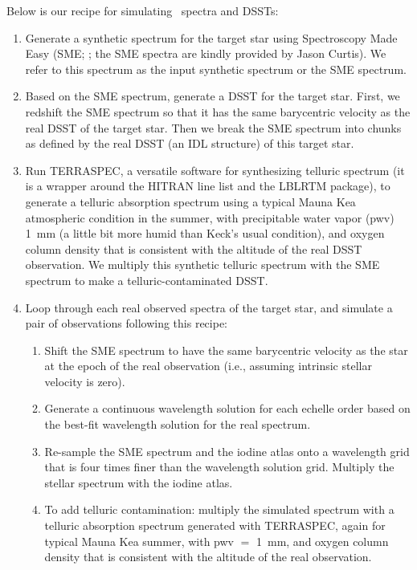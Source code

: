 Below is our recipe for simulating \keck\ spectra and DSSTs:
\begin{enumerate}
\item Generate a synthetic spectrum for the target star using
  Spectroscopy Made Easy (SME;
  \citealt{valentipiskunov1996,valentifischer2005}; the SME spectra are
  kindly provided by Jason Curtis). We refer to this spectrum as the
  input synthetic spectrum or the SME spectrum.
\item Based on the SME spectrum, generate a DSST for the target
  star. First, we redshift the SME spectrum so that it has the same
  barycentric velocity as the real DSST of the target star. Then we
  break the SME spectrum into chunks as defined by the real DSST (an IDL
  structure) of this target star.
\item Run TERRASPEC, a versatile software for synthesizing telluric
  spectrum (it is a wrapper around the HITRAN line list and the LBLRTM
  package), to generate a telluric absorption spectrum using a typical
  Mauna Kea atmospheric condition in the summer, with precipitable water
  vapor (pwv) 1~mm (a little bit more humid than Keck's usual
  condition), and oxygen column density that is consistent with the
  altitude of the real DSST observation. We multiply this synthetic
  telluric spectrum with the SME spectrum to make a
  telluric-contaminated DSST.
\item Loop through each real observed spectra of the target star, and
  simulate a pair of observations following this recipe:
  \begin{enumerate}
  \item Shift the SME spectrum to have the same barycentric velocity
    as the star at the epoch of the real observation (i.e., assuming
    intrinsic stellar velocity is zero).
  \item Generate a continuous wavelength solution for each echelle
      order based on the best-fit wavelength solution for the real
      spectrum. 
  \item Re-sample the SME spectrum and the iodine atlas onto a
    wavelength grid that is four times finer than the wavelength
    solution grid. Multiply the stellar spectrum with the iodine
    atlas.
  \item To add telluric contamination: multiply the simulated spectrum
    with a telluric absorption spectrum generated with TERRASPEC, again
    for typical Mauna Kea summer, with pwv $=$ 1~mm, and oxygen column
    density that is consistent with the altitude of the real observation.

\end{enumerate}
\end{enumerate}
